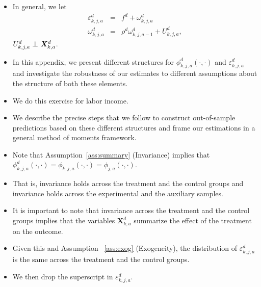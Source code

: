 \documentclass[static]{JJH-Beamer}
\newcommand\independent{\protect\mathpalette{\protect\independenT}{\perp}}
\def\independenT#1#2{\mathrel{\rlap{$#1#2$}\mkern2mu{#1#2}}}
\begin{document}
\begin{frame}

\begin{itemize}
\item In general, we let
    \begin{eqnarray}
    \varepsilon^d_{k,j,a} &=& f^d + \omega^d_{k,j,a} \nonumber \\
    \omega^d_{k,j,a}      &=& \rho^d \omega^d_{k,j,a-1} + U^d_{k,j,a},
    \end{eqnarray}
$U^d_{k,j,a} \independent \bm{X}^d_{k,a}$.
\end{itemize}

\end{frame}

\begin{frame}

\begin{itemize}
\item In this appendix, we present different structures for $\phi_{k,j,a}^d \left( \cdot, \cdot \right)$ and $\varepsilon_{k,j,a}^d$ and investigate the robustness of our estimates to different assumptions about the structure of both these elements.
\item We do this exercise for labor income.
\item We describe the precise steps that we follow to construct out-of-sample predictions based on these different structures and frame our estimations in a general method of moments framework.
\end{itemize}

\end{frame}

\begin{frame}

\begin{itemize}
\item Note that Assumption~\ref{ass:summary} (Invariance) implies that $\phi_{k,j,a}^d \left (\cdot, \cdot \right) = \phi_{k,j,a}  \left (\cdot, \cdot \right) = \phi_{j,a}  \left (\cdot, \cdot \right)$.
\item That is, invariance holds across the treatment and the control groups and invariance holds across the experimental and the auxiliary samples.
\item It is important to note that invariance across the treatment and the control groups implies that the variables $\bm{X}_{k,a}^d$ summarize the effect of the treatment on the outcome.
\item Given this and Assumption ~\ref{ass:exog} (Exogeneity), the distribution of $\varepsilon_{k,j,a}^d$ is the same across the treatment and the control groups.
\item We then drop the superscript in $\varepsilon_{k,j,a}^d$.
\end{itemize}

\end{frame}
\end{document}
